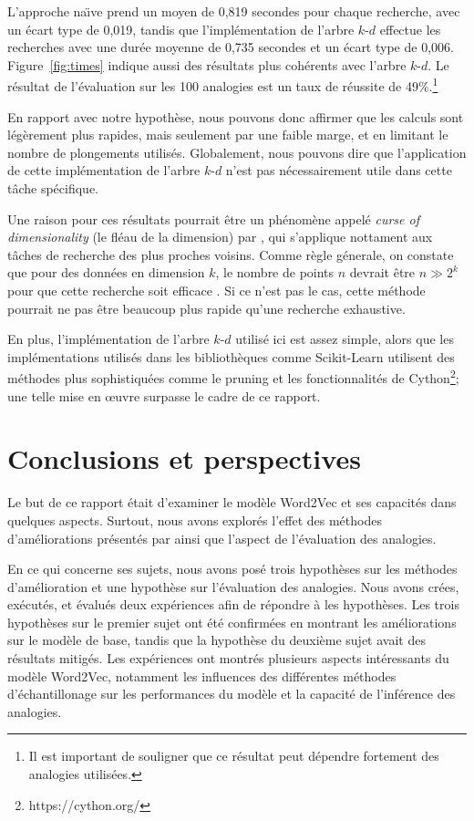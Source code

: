 \documentclass[12pt]{article}
\begin{document}
L'approche na\"\i ve prend un moyen de 0{,}819 secondes pour chaque recherche, avec un écart type de 0{,}019, tandis que l'implémentation de l'arbre $k$-$d$ effectue les recherches avec une durée moyenne de 0{,}735 secondes et un écart type de 0{,}006. Figure~\ref{fig:times} indique aussi des résultats plus cohérents avec l'arbre $k$-$d$. Le résultat de l'évaluation sur les 100 analogies est un taux de réussite de 49\%.\footnote{Il est important de souligner que ce résultat peut dépendre fortement des analogies utilisées.}

En rapport avec notre hypothèse, nous pouvons donc affirmer que les calculs sont légèrement plus rapides, mais seulement par une faible marge, et en limitant le nombre de plongements utilisés. Globalement, nous pouvons dire que l'application de cette implémentation de l'arbre $k$-$d$ n'est pas nécessairement utile dans cette tâche spécifique.

Une raison pour ces résultats pourrait être un phénomène appelé \textit{curse of dimensionality} (le fléau de la dimension) par \cite{Freimer1961AdaptiveCP}, qui s'applique nottament aux tâches de recherche des plus proches voisins. Comme règle génerale, on constate que pour des données en dimension $ k $, le nombre de points $ n $ devrait être $ n \gg 2^k $ pour que cette recherche soit efficace \citep{indyk2004nearest}. Si ce n'est pas le cas, cette méthode pourrait ne pas être beaucoup plus rapide qu'une recherche exhaustive.

En plus, l'implémentation de l'arbre $k$-$d$ utilisé ici est assez simple, alors que les implémentations utilisés dans les bibliothèques comme Scikit-Learn utilisent des méthodes plus sophistiquées comme le pruning et les fonctionnalités de Cython\footnote{https://cython.org/}; une telle mise en œuvre surpasse le cadre de ce rapport. 

\section{Conclusions et perspectives} \label{conclusions et perspectives}

Le but de ce rapport était d'examiner le modèle Word2Vec et ses capacités dans quelques aspects. Surtout, nous avons explorés l'effet des méthodes d'améliorations présentés par \cite{DBLP:conf/nips/MikolovSCCD13} ainsi que l'aspect de l'évaluation des analogies.

En ce qui concerne ses sujets, nous avons posé trois hypothèses sur les méthodes d'amélioration et une hypothèse sur l'évaluation des analogies. Nous avons crées, exécutés, et évalués deux expériences afin de répondre à les hypothèses. Les trois hypothèses sur le premier sujet ont été confirmées en montrant les améliorations sur le modèle de base, tandis que la hypothèse du deuxième sujet avait des résultats mitigés. Les expériences ont montrés plusieurs aspects intéressants du modèle Word2Vec, notamment les influences des différentes méthodes d'échantillonage sur les performances du modèle et la capacité de l'inférence des analogies. 
\end{document}
